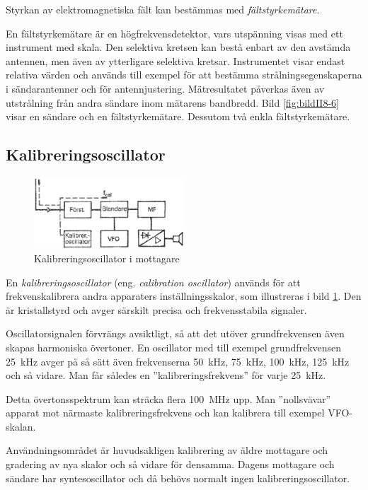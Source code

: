 Styrkan av elektromagnetiska fält kan bestämmas med \emph{fältstyrkemätare}.

En fältstyrkemätare är en högfrekvensdetektor, vars utspänning visas med ett
instrument med skala.
Den selektiva kretsen kan bestå enbart av den avstämda antennen, men även av
ytterligare selektiva kretsar.
Instrumentet visar endast relativa värden och används till exempel för att
bestämma strålningsegenskaperna i sändarantenner och för antennjustering.
Mätresultatet påverkas även av utstrålning från andra sändare inom mätarens
bandbredd.
Bild \ref{fig:bildII8-6} visar en sändare och en fältstyrkemätare.
Dessutom två enkla fältstyrkemätare.

\subsection{Kalibreringsoscillator}

\begin{figure}
  \includegraphics[width=0.5\textwidth]{images/cropped_pdfs/bild_2_8-07.pdf}
  \caption{Kalibreringsoscillator i mottagare}
  \label{fig:bildII8-7}
\end{figure}

En \emph{kalibreringsoscillator} (eng. \emph{calibration oscillator}) används
för att frekvenskalibrera andra apparaters inställningsskalor, som illustreras
i bild \ref{fig:bildII8-7}.
Den är kristallstyrd och avger särskilt precisa och frekvensstabila signaler.

Oscillatorsignalen förvrängs avsiktligt, så att det utöver grundfrekvensen även
skapas harmoniska övertoner.
En oscillator med till exempel grundfrekvensen 25~kHz avger på så sätt även
frekvenserna 50~kHz, 75~kHz, 100~kHz, 125~kHz och så vidare.
Man får således en ''kalibreringsfrekvens'' för varje 25~kHz.

Detta övertonsspektrum kan sträcka flera 100~MHz upp.
Man ''nollsvävar'' apparat mot närmaste kalibreringsfrekvens och kan kalibrera
till exempel VFO-skalan.

Användningsområdet är huvudsakligen kalibrering av äldre mottagare och gradering
av nya skalor och så vidare för densamma.
Dagens mottagare och sändare har syntesoscillator och då behövs normalt ingen
kalibreringsoscillator.

